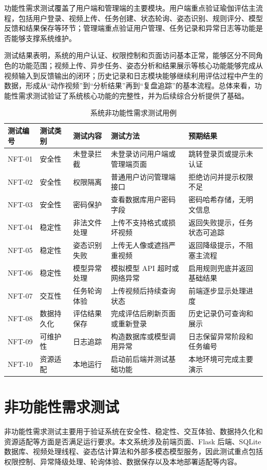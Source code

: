 \documentclass[UTF8,twoside]{ctexrep}
\makeatletter
\def@NAT@last@yr{\@citea}%
\def@NAT@last@yr{-\NAT@penalty}%
\makeatother
\begin{document}
功能性需求测试覆盖了用户端和管理端的主要模块。用户端重点验证瑜伽评估主流程，包括用户登录、视频上传、任务创建、状态轮询、姿态识别、规则评分、模型反馈和结果保存等环节；管理端重点验证用户管理、任务记录和异常日志等功能是否能够支撑系统维护。

测试结果表明，系统的用户认证、权限控制和页面访问基本正常，能够区分不同角色的功能范围；视频上传、异步任务、姿态分析和结果展示等核心功能能够完成从视频输入到反馈输出的闭环；历史记录和日志模块能够继续利用评估过程中产生的数据，形成从“动作视频”到“分析结果”再到“复盘追踪”的基本流程。总体来看，功能性需求测试验证了系统核心功能的完整性，并为后续综合分析提供了基础。
\begin{table}[H]
  \centering
  \caption{系统非功能性需求测试用例}
  \label{tab:non_function_test}
  \begin{tabular}{p{1.35cm}p{2.0cm}p{2.7cm}p{4.0cm}p{3.0cm}}
    \toprule
    测试编号 & 测试类别 & 测试内容 & 测试方法 & 预期结果 \\
    \midrule
    NFT-01 & 安全性 & 未登录拦截 & 未登录访问用户端或管理端页面 & 跳转登录页或提示未认证 \\
    NFT-02 & 安全性 & 权限隔离 & 普通用户访问管理端接口 & 拒绝访问并提示权限不足 \\
    NFT-03 & 安全性 & 密码保护 & 查看数据库用户密码字段 & 密码哈希存储，无明文信息 \\
    NFT-04 & 稳定性 & 非法文件处理 & 上传不支持格式或损坏视频 & 返回失败提示，任务状态可追踪 \\
    NFT-05 & 稳定性 & 姿态识别失败 & 上传无人像或遮挡严重视频 & 返回降级提示，不阻塞主流程 \\
    NFT-06 & 稳定性 & 模型异常处理 & 模拟模型 API 超时或网络异常 & 启用规则兜底并返回基础结果 \\
    NFT-07 & 交互性 & 任务轮询体验 & 上传视频后持续查询状态 & 前端逐步显示处理进度 \\
    NFT-08 & 数据持久化 & 评估结果保存 & 完成评估后刷新页面或重新登录 & 历史记录仍可查询和展示 \\
    NFT-09 & 可维护性 & 日志追踪 & 构造数据库或模型调用异常 & 日志保留异常阶段和任务编号 \\
    NFT-10 & 资源适配 & 本地运行 & 启动前后端并测试基础功能 & 本地环境可完成主要演示 \\
    \bottomrule
  \end{tabular}
\end{table}
\section{非功能性需求测试}
非功能性需求测试主要用于验证系统在安全性、稳定性、交互体验、数据持久化和资源适配等方面是否满足运行要求。本文系统涉及前端页面、Flask 后端、SQLite 数据库、视频处理线程、姿态估计算法和外部多模态模型服务，因此测试重点包括权限控制、异常降级处理、轮询体验、数据保存以及本地部署适配等内容。
\end{document}

